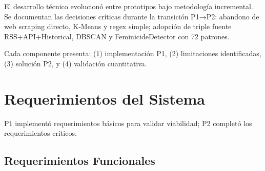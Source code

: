 ﻿%

El desarrollo técnico evolucionó entre prototipos bajo metodología incremental. Se documentan las decisiones críticas durante la transición P1→P2: abandono de web scraping directo, K-Means y regex simple; adopción de triple fuente RSS+API+Historical, DBSCAN y FeminicideDetector con 72 patrones.

Cada componente presenta: (1) implementación P1, (2) limitaciones identificadas, (3) solución P2, y (4) validación cuantitativa.

\section{Requerimientos del Sistema}
\label{sec:requerimientos}

P1 implementó requerimientos básicos para validar viabilidad; P2 completó los requerimientos críticos.

\subsection{Requerimientos Funcionales}
\label{subsec:rf}

